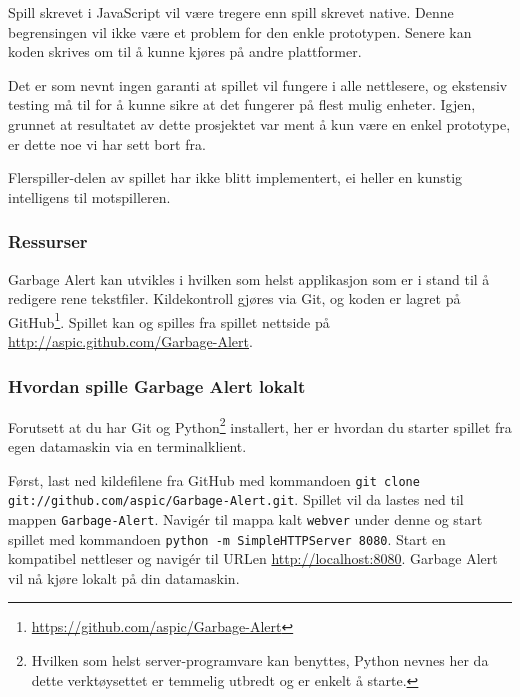 Spill skrevet i JavaScript vil være tregere enn spill skrevet native.
Denne begrensingen vil ikke være et problem for den enkle prototypen.
Senere kan koden skrives om til å kunne kjøres på andre plattformer.

Det er som nevnt ingen garanti at spillet vil fungere i alle nettlesere,
og ekstensiv testing må til for å kunne sikre at det fungerer på flest
mulig enheter. Igjen, grunnet at resultatet av dette prosjektet var ment
å kun være en enkel prototype, er dette noe vi har sett bort fra.

Flerspiller-delen av spillet har ikke blitt implementert, ei heller en
kunstig intelligens til motspilleren.

\subsubsection{Ressurser}
Garbage Alert kan utvikles i hvilken som helst applikasjon som er i
stand til å redigere rene tekstfiler. Kildekontroll gjøres via Git, og
koden er lagret på
GitHub\footnote{\url{https://github.com/aspic/Garbage-Alert}}. Spillet
kan og spilles fra spillet nettside på
\url{http://aspic.github.com/Garbage-Alert}.

\subsubsection{Hvordan spille Garbage Alert lokalt}
Forutsett at du har Git og Python\footnote{Hvilken som helst
server-programvare kan benyttes, Python nevnes her da dette
verktøysettet er temmelig utbredt og er enkelt å starte.} installert,
her er hvordan du starter spillet fra egen datamaskin via en
terminalklient.

Først, last ned kildefilene fra GitHub med kommandoen
\newline\texttt{git clone git://github.com/aspic/Garbage-Alert.git}.
Spillet vil da lastes ned til mappen \texttt{Garbage-Alert}. Navigér til
mappa kalt \texttt{webver} under denne  og start spillet med kommandoen
\texttt{python -m SimpleHTTPServer 8080}. Start en kompatibel nettleser
og navigér til URLen \url{http://localhost:8080}. Garbage Alert vil nå
kjøre lokalt på din datamaskin.
